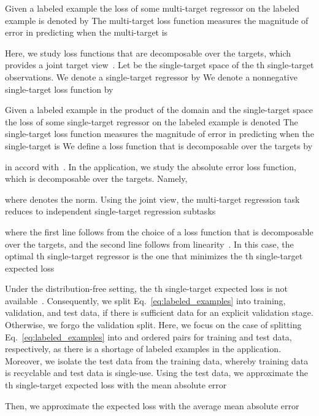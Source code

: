 \documentclass[aps,twocolumn,superscriptaddress,floatfix,preprintnumbers,showkeys]{revtex4}
\begin{document}
Given a labeled example  the loss of some multi-target regressor  on the labeled example is denoted by  The multi-target loss function measures the magnitude of error in predicting  when the multi-target is  

Here, we study loss functions that are decomposable over the targets, which provides a joint target view~\cite{Borchani_2015, Waegeman_2019}. Let  be the single-target space of the th single-target observations. We denote a single-target regressor by
 We denote a nonnegative single-target loss function by 

Given a labeled example in the product of the domain and the single-target space  the loss of some single-target regressor  on the labeled example is denoted  The single-target loss function measures the magnitude of error in predicting  when the single-target is  We define a loss function that is decomposable over the targets by  

in accord with~\cite{Borchani_2015, Waegeman_2019}. In the application, we study the absolute error loss function, which is decomposable over the targets. Namely,

where  denotes the  norm. Using the joint view, the multi-target regression task reduces to  independent single-target regression subtasks

where the first line follows from the choice of a loss function that is decomposable over the targets, and the second line follows from linearity~\cite{Borchani_2015, Waegeman_2019}. In this case, the optimal th single-target regressor is the one that minimizes the th single-target expected loss


Under the distribution-free setting, the th single-target expected loss is not available~\cite{Haussler_1992, Kearns_1994_1, Kearns_1994_2, Friedman_2001, Friedman_2003, Hastie_2009}. Consequently, we split Eq.~\ref{eq:labeled_examples} into training, validation, and test data, if there is sufficient data for an explicit validation stage. Otherwise, we forgo the validation split. Here, we focus on the case of splitting Eq.~\ref{eq:labeled_examples} into  and  ordered pairs for training and test data, respectively, as there is a shortage of labeled examples in the application. Moreover, we isolate the test data from the training data, whereby training data is recyclable and test data is single-use. Using the test data, we approximate the th single-target expected loss with the mean absolute error 

Then, we approximate the expected loss with the average mean absolute error
\end{document}
